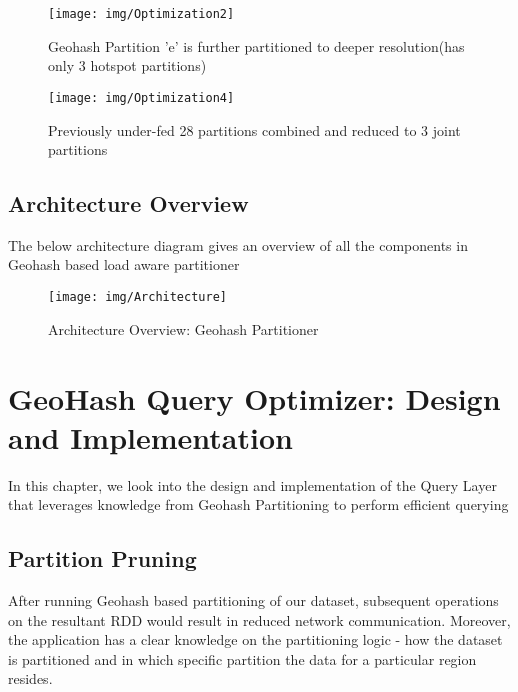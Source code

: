 \documentclass[article,type=msc,colorback,10pt,accentcolor=tud1d]{tudthesis}
\begin{document}
			\clearpage	
						
			\begin{figure}[p]
			\centering
			\texttt{[image: img/Optimization2]}
			\caption{Geohash Partition 'e' is further partitioned to deeper resolution(has only 3 hotspot partitions)}
			\label{fig:Optimization2}
			\end{figure}
						
						
			\begin{figure}[p]
			\centering
			\texttt{[image: img/Optimization4]}
			\caption{Previously under-fed 28 partitions combined and reduced to 3 joint partitions}
			\label{fig:Optimization4}
			\end{figure}
			
			\clearpage
			\subsection{Architecture Overview}
				\par The below architecture diagram gives an overview of all the components in Geohash based load aware partitioner \\
				\begin{figure}[h]
					\centering
					\texttt{[image: img/Architecture]}
					\caption{Architecture Overview: Geohash Partitioner}
					\label{fig:Architecture}
				\end{figure}
				
			
			
	  \cleardoublepage
	\hfill
	\section{GeoHash Query Optimizer: Design and Implementation}
	\hfill
	
		\par In this chapter, we look into the design and implementation of the Query Layer that leverages knowledge from Geohash Partitioning to perform efficient querying 
		\subsection{Partition Pruning}
			\par After running Geohash based partitioning of our dataset, subsequent operations on the resultant RDD would result in reduced network communication. Moreover, the application has a clear knowledge on the partitioning logic - how the dataset is partitioned and in which specific partition the data for a particular region resides.
			
\end{document}
